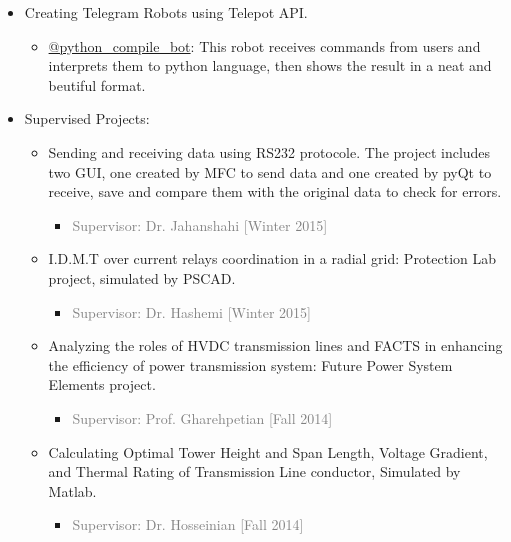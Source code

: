 \documentclass[10pt,a4paper,sans]{moderncv} %
\begin{document}
\begin{itemize}
\begin{itemize}
		\item Creating Telegram Robots using Telepot API.
		 \begin{itemize}
		 	\item \href{https://telegram.me/python_compile_bot}{@python\_compile\_bot}: This robot receives commands from users and interprets them to python language, then shows the result in a neat and beutiful format.
		 \end{itemize}
		 
	\end{itemize}
\end{itemize}
\begin{itemize}
	\item Supervised Projects:
	\begin{itemize}

		\item Sending and receiving data using RS232 protocole. The project includes two GUI, one created by MFC to send data and one created by pyQt to receive, save and compare them with the original data to check for errors.
		\begin{itemize}
			\item \textcolor{gray}{Supervisor: Dr. Jahanshahi [Winter 2015]}
		\end{itemize}
		
		\item  I.D.M.T over current relays coordination in a radial grid: Protection Lab project, simulated by PSCAD.
		 \begin{itemize}
		\item \textcolor{gray}{Supervisor: Dr. Hashemi [Winter 2015]}
		\end{itemize}
		
		 \item Analyzing the roles of HVDC transmission lines and FACTS in enhancing the eﬃciency of power transmission system: Future Power System Elements project.
		 \begin{itemize}
		\item \textcolor{gray}{Supervisor: Prof. Gharehpetian [Fall 2014]} 
		\end{itemize}
		 
		\item Calculating Optimal Tower Height and Span Length, Voltage Gradient, and Thermal Rating of Transmission Line conductor, Simulated by Matlab.
		\begin{itemize}
		\item \textcolor{gray}{Supervisor: Dr. Hosseinian [Fall 2014]}
		\end{itemize}
		

\end{itemize}
\end{itemize}
\end{document}
